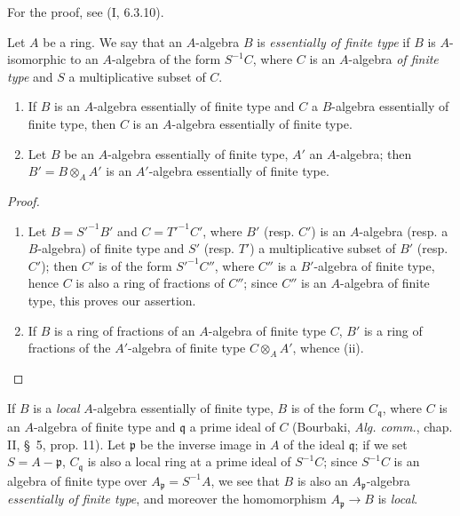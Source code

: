 For the proof, see (I, 6.3.10).

\begin{env}[1.3.8]
\label{IV.1.3.8}
Let $A$ be a ring. We say that an $A$-algebra $B$ is \emph{essentially of
finite type} if $B$ is $A$-isomorphic to an $A$-algebra of the form $S^{-1}C$,
where $C$ is an $A$-algebra \emph{of finite type} and $S$ a multiplicative
subset of $C$.
\end{env}

\par\medskip\noindent
\begin{proposition}[1.3.9]
\label{IV.1.3.9}
\begin{enumerate}
  \item[(i)] If $B$ is an $A$-algebra essentially of finite type and $C$
  a $B$-algebra essentially of finite type, then $C$ is an
  $A$-algebra essentially of finite type.
  \item[(ii)] Let $B$ be an $A$-algebra essentially of finite type, $A'$
  an $A$-algebra; then $B'=B\otimes_AA'$ is an $A'$-algebra
  essentially of finite type.
\end{enumerate}
\end{proposition}

\begin{proof}
\begin{enumerate}
  \item[(i)] Let $B=S'^{-1}B'$ and $C=T'^{-1}C'$, where $B'$ (resp. $C'$) is
  an $A$-algebra (resp. a $B$-algebra) of finite type and $S'$ (resp. $T'$)
  a multiplicative subset of $B'$ (resp. $C'$); then $C'$ is of the form
  $S'^{-1}C''$, where $C''$ is a $B'$-algebra of finite type, hence $C$ is
  also a ring of fractions of $C''$; since $C''$ is an $A$-algebra of finite
  type, this proves our assertion.
  \item[(ii)] If $B$ is a ring of fractions of an $A$-algebra of finite type
  $C$, $B'$ is a ring of fractions of the $A'$-algebra of finite type
  $C\otimes_AA'$, whence (ii).
\end{enumerate}
\end{proof}


\begin{env}[1.3.10]
\label{IV.1.3.10}
If $B$ is a \emph{local} $A$-algebra essentially of finite type, $B$ is
of the form $C_{\mathfrak q}$, where $C$ is an $A$-algebra of finite type and
$\mathfrak q$ a prime ideal of $C$ (Bourbaki, \emph{Alg. comm.}, chap. II,
\S~5, prop. 11). Let $\mathfrak p$ be the inverse image in $A$ of the ideal
$\mathfrak q$; if we set $S=A-\mathfrak p$, $C_{\mathfrak q}$ is also a
local ring at a prime ideal of $S^{-1}C$; since $S^{-1}C$ is an
algebra of finite type over $A_{\mathfrak p}=S^{-1}A$, we see that $B$ is also
an $A_{\mathfrak p}$-algebra \emph{essentially of finite type}, and moreover
the homomorphism $A_{\mathfrak p}\to B$ is \emph{local}.
\end{env}

